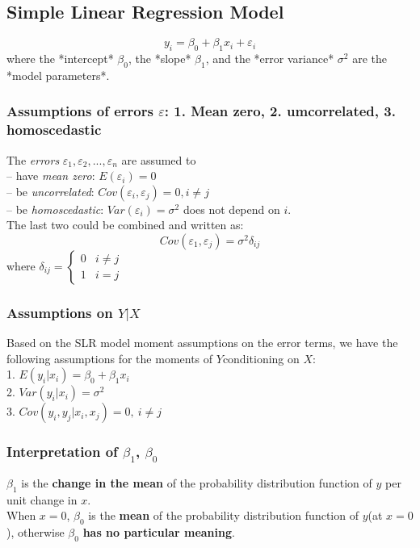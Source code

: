 \documentclass[11pt,a4paper]{article}
\begin{document}
\subsection{Simple Linear Regression Model}
$$y_i=\beta_0+\beta_1 x_i+\varepsilon_i $$
where the *intercept* $\beta_0$, the *slope* $\beta_1$, and the *error variance* $\sigma^2$ are the *model parameters*.

\subsubsection{Assumptions of errors $\varepsilon$: 1. Mean zero, 2. umcorrelated, 3. homoscedastic}
The \textit{errors} $\varepsilon_1 , \varepsilon_2 , . . . , \varepsilon_n$ are assumed to\\
– have \textit{mean zero}: $E(\varepsilon_i ) = 0$\\
– be \textit{uncorrelated}: $Cov(\varepsilon_ i , \varepsilon_ j ) = 0, i \neq j$\\
– be \textit{homoscedastic}: $Var(\varepsilon_i ) = \sigma^ 2$ does not depend on $i$.\\

The last two could be combined and written as:
$$Cov(\varepsilon_1,\varepsilon_j)=\sigma^2\delta_{ij}$$
where $\delta_{ij}=\left\{\begin{matrix}
    0&i\neq j\\
    1&i=j
\end{matrix}\right.$

\subsubsection{Assumptions on $Y|X$}
Based on the SLR model moment assumptions on the error terms, we have the following assumptions for the moments of $Y $conditioning on $X$:\\
1. $E(y_i|x_i)=\beta_0+\beta_1x_i$\\
2. $Var(y_i|x_i)=\sigma^2$\\
3. $Cov(y_i,y_j|x_i,x_j)=0,\ i\neq j$
\subsubsection{Interpretation of $\beta_1$, $\beta_0$}
$\beta_1$ is the \textbf{change in the mean} of the probability distribution function of $y$ per unit change in $x$.\\
When $x=0$, $\beta_0$ is the \textbf{mean} of the probability distribution function of $y$(at $x=0$), otherwise $\beta_0$ \textbf{has no particular meaning}.\\
\end{document}
